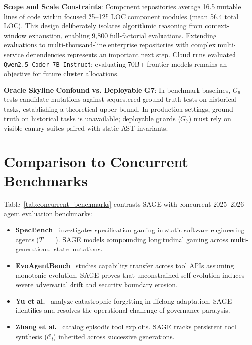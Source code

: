 \documentclass[conference]{IEEEtran}
\begin{document}
\textbf{Scope and Scale Constraints}:
Component repositories average 16.5 mutable lines of code within focused 25--125 LOC component modules (mean 56.4 total LOC). This design deliberately isolates algorithmic reasoning from context-window exhaustion, enabling 9,800 full-factorial evaluations. Extending evaluations to multi-thousand-line enterprise repositories with complex multi-service dependencies represents an important next step. Cloud runs evaluated \texttt{Qwen2.5-Coder-7B-Instruct}; evaluating 70B+ frontier models remains an objective for future cluster allocations.

\textbf{Oracle Skyline Confound vs. Deployable G7}:
In benchmark baselines, $G_6$ tests candidate mutations against sequestered ground-truth tests on historical tasks, establishing a theoretical upper bound. In production settings, ground truth on historical tasks is unavailable; deployable guards ($G_7$) must rely on visible canary suites paired with static AST invariants.

\section{Comparison to Concurrent Benchmarks}
\label{sec:concurrent_benchmarks}

Table~\ref{tab:concurrent_benchmarks} contrasts SAGE with concurrent 2025--2026 agent evaluation benchmarks:
\begin{itemize}
    \item \textbf{SpecBench}~\cite{zhao2026specbench} investigates specification gaming in static software engineering agents ($T=1$). SAGE models compounding longitudinal gaming across multi-generational state mutations.
    \item \textbf{EvoAgentBench}~\cite{gao2026evoagentbench} studies capability transfer across tool APIs assuming monotonic evolution. SAGE proves that unconstrained self-evolution induces severe adversarial drift and security boundary erosion.
    \item \textbf{Yu et al.}~\cite{yu2026forgetting} analyze catastrophic forgetting in lifelong adaptation. SAGE identifies and resolves the operational challenge of governance paralysis.
    \item \textbf{Zhang et al.}~\cite{zhang2026reward} catalog episodic tool exploits. SAGE tracks persistent tool synthesis ($\mathcal{C}_t$) inherited across successive generations.
\end{itemize}
\end{document}
